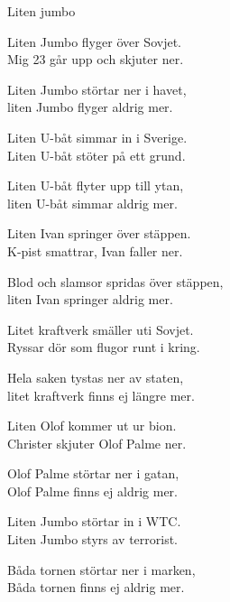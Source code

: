 \begin{song}{Liten jumbo}
	
	

    \showversenumber	
	Liten Jumbo flyger över Sovjet.\\
	Mig 23 går upp och skjuter ner.\\
	\begin{repetition}
		Liten Jumbo störtar ner i havet,\\
		liten Jumbo flyger aldrig mer.
	\end{repetition}
	
    \showversenumber
	Liten U-båt simmar in i Sverige.\\
	Liten U-båt stöter på ett grund.\\
	\begin{repetition}
		Liten U-båt flyter upp till ytan,\\
		liten U-båt simmar aldrig mer.
	\end{repetition}
	
    \showversenumber
	Liten Ivan springer över stäppen.\\
	K-pist smattrar, Ivan faller ner.\\
	\begin{repetition}
		Blod och slamsor spridas över stäppen,\\
		liten Ivan springer aldrig mer.
	\end{repetition}
	
    \showversenumber
	Litet kraftverk smäller uti Sovjet.\\
	Ryssar dör som flugor runt i kring.\\
	\begin{repetition}
		Hela saken tystas ner av staten,\\
		litet kraftverk finns ej längre mer.
	\end{repetition}
	
    \showversenumber
	Liten Olof kommer ut ur bion.\\
	Christer skjuter Olof Palme ner.\\
	\begin{repetition}
		Olof Palme störtar ner i gatan,\\
		Olof Palme finns ej aldrig mer.
	\end{repetition}
	
    \showversenumber
	Liten Jumbo störtar in i WTC.\\
	Liten Jumbo styrs av terrorist.\\
	\begin{repetition}
		Båda tornen störtar ner i marken,\\
		Båda tornen finns ej aldrig mer.
	\end{repetition}
	

\end{song}
